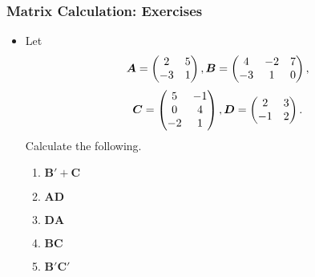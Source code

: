 \documentclass[pdflatex, 12pt]{beamer}
\begin{document}
\begin{frame}
\frametitle{Matrix Calculation: Exercises}
\begin{itemize}
\item Let 
 \begin{equation}
 \bm{A} = \begin{pmatrix}
 2 & 5 \\
 -3 & 1 \\
 \end{pmatrix}, \bm{B} = \begin{pmatrix}
 4 & -2 & 7 \\
 -3 & 1 & 0 \\
 \end{pmatrix}, \notag
 \end{equation}
 \begin{equation}
 \bm{C} = \begin{pmatrix}
 5 & -1 \\
 0 & 4 \\
 -2 & 1 \\
 \end{pmatrix}, \bm{D} = \begin{pmatrix}
 2 & 3 \\
 -1 & 2 \\
 \end{pmatrix}. \notag
 \end{equation}
Calculate the following.
 \begin{enumerate}
 \item $\bm{B}' + \bm{C}$
 \item $\bm{AD}$
 \item $\bm{DA}$
 \item $\bm{BC}$
 \item $\bm{B}'\bm{C}'$
 \end{enumerate}
\end{itemize}
\end{frame}
\end{document}
